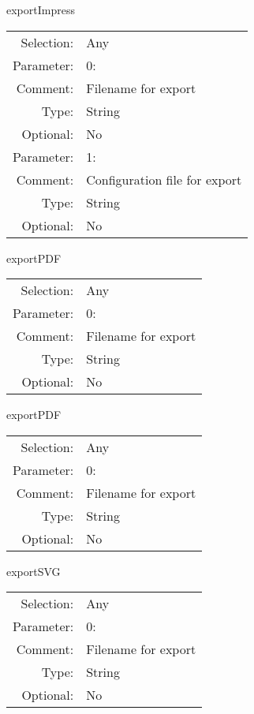 \item exportImpress\\
\begin{tabular}{rl}
  Selection: & Any\\
   Parameter: &  0:\\
        Comment: & Filename for export\\
           Type: & String\\
       Optional: &  No\\
   Parameter: &  1:\\
        Comment: & Configuration file for export\\
           Type: & String\\
       Optional: &  No\\
\end{tabular}

\item exportPDF\\
\begin{tabular}{rl}
  Selection: & Any\\
   Parameter: &  0:\\
        Comment: & Filename for export\\
           Type: & String\\
       Optional: &  No\\
\end{tabular}

\item exportPDF\\
\begin{tabular}{rl}
  Selection: & Any\\
   Parameter: &  0:\\
        Comment: & Filename for export\\
           Type: & String\\
       Optional: &  No\\
\end{tabular}

\item exportSVG\\
\begin{tabular}{rl}
  Selection: & Any\\
   Parameter: &  0:\\
        Comment: & Filename for export\\
           Type: & String\\
       Optional: &  No\\
\end{tabular}

